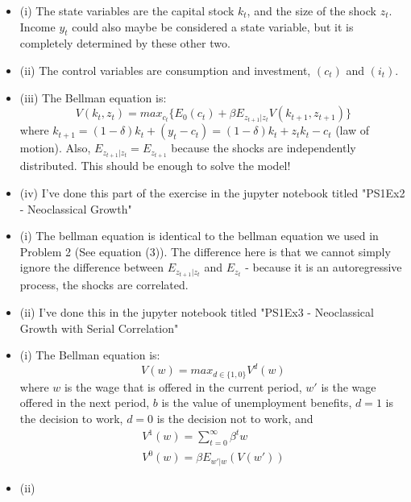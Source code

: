\documentclass[12pt]{article}
\newenvironment{problem}[2][Problem]{\begin{trivlist}
\item[\hskip \labelsep {\bfseries #1}\hskip \labelsep {\bfseries #2.}]}{\end{trivlist}}
\theoremstyle{definition}
\theoremstyle{definition}
\theoremstyle{definition}
\theoremstyle{definition}
\begin{document}
\begin{problem}{2}
\begin{itemize}
\item (i) The state variables are the capital stock $k_t$, and the size of the shock $z_t$. Income $y_t$ could also maybe be considered a state variable, but it is completely determined by these other two.
\item (ii) The control variables are consumption and investment, $(c_t)$ and $(i_t)$.
\item (iii) The Bellman equation is: 
\begin{equation}
V(k_t, z_t) = max_{c_t}  \big\{ E_0(c_t) + \beta E_{z_{t+1}|z_t}V(k_{t+1},z_{t+1}) \big\}
\end{equation}
where $k_{t+1} = (1 - \delta)k_t + (y_t - c_t) =(1-\delta)k_t + z_tk_t - c_t$ (law of motion). Also, $ E_{z_{t+1}|z_t} = E_{z_{t+1}}$  because the shocks are independently distributed. This should be enough to solve the model!
\item (iv) I've done this part of the exercise in the jupyter notebook titled "PS1Ex2 - Neoclassical Growth"
\end{itemize}
\end{problem}
\begin{problem}{3}
\begin{itemize}
\item (i) The bellman equation is identical to the bellman equation we used in Problem 2 (See equation (3)). The difference here is that we cannot simply ignore the difference between $E_{z_{t+1}|z_t}$ and $E_{z_t}$ - because it is an autoregressive process, the shocks are correlated.
\item (ii) I've done this in the jupyter notebook titled "PS1Ex3 - Neoclassical Growth with Serial Correlation"
\end{itemize}
\end{problem}
\begin{problem}{4}
\begin{itemize}
\item (i) The Bellman equation is: 
$$
V(w) = max_{d \in \{1, 0\}} V^d(w)
$$
where $w$ is the wage that is offered in the current period, $w'$ is the wage offered in the next period, $b$ is the value of unemployment benefits, $d = 1$ is the decision to work, $d =0$ is the decision not to work, and 
\begin{align*}
V^1(w) = \sum_{t=0}^\infty \beta^t w \\ V^0(w) = \beta E_{w' | w} (V(w')) 
\end{align*}
\item (ii) 
\end{itemize}
\end{problem}
\end{document}
